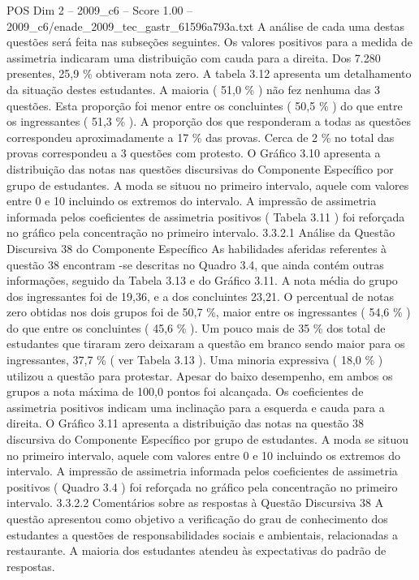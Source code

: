 \begin{textsample}{POS Dim 2 – 2009\_c6 – Score 1.00 – 2009\_c6/enade\_2009\_tec\_gastr\_61596a793a.txt}
A análise de cada uma destas questões será feita nas subseções seguintes.
Os valores positivos para a medida de assimetria indicaram uma distribuição com cauda para a direita.
Dos 7.280 presentes, 25,9 \% obtiveram nota zero.
A tabela 3.12 apresenta um detalhamento da situação destes estudantes.
A maioria ( 51,0 \% ) não fez nenhuma das 3 questões.
Esta proporção foi menor entre os concluintes ( 50,5 \% ) do que entre os ingressantes ( 51,3 \% ).
A proporção dos que responderam a todas as questões correspondeu aproximadamente a 17 \% das provas.
Cerca de 2 \% no total das provas correspondeu a 3 questões com protesto.
O Gráfico 3.10 apresenta a distribuição das notas nas questões discursivas do Componente Específico por grupo de estudantes.
A moda se situou no primeiro intervalo, aquele com valores entre 0 e 10 incluindo os extremos do intervalo.
A impressão de assimetria informada pelos coeficientes de assimetria positivos ( Tabela 3.11 ) foi reforçada no gráfico pela concentração no primeiro intervalo. 3.3.2.1 Análise da Questão Discursiva 38 do Componente Específico As habilidades aferidas referentes à questão 38 encontram -se descritas no Quadro 3.4, que ainda contém outras informações, seguido da Tabela 3.13 e do Gráfico 3.11.
A nota média do grupo dos ingressantes foi de 19,36, e a dos concluintes 23,21.
O percentual de notas zero obtidas nos dois grupos foi de 50,7 \%, maior entre os ingressantes ( 54,6 \% ) do que entre os concluintes ( 45,6 \% ).
Um pouco mais de 35 \% dos total de estudantes que tiraram zero deixaram a questão em branco sendo maior para os ingressantes, 37,7 \% ( ver Tabela 3.13 ).
Uma minoria expressiva ( 18,0 \% ) utilizou a questão para protestar.
Apesar do baixo desempenho, em ambos os grupos a nota máxima de 100,0 pontos foi alcançada.
Os coeficientes de assimetria positivos indicam uma inclinação para a esquerda e cauda para a direita.
O Gráfico 3.11 apresenta a distribuição das notas na questão 38 discursiva do Componente Específico por grupo de estudantes.
A moda se situou no primeiro intervalo, aquele com valores entre 0 e 10 incluindo os extremos do intervalo.
A impressão de assimetria informada pelos coeficientes de assimetria positivos ( Quadro 3.4 ) foi reforçada no gráfico pela concentração no primeiro intervalo. 3.3.2.2 Comentários sobre as respostas à Questão Discursiva 38 A questão apresentou como objetivo a verificação do grau de conhecimento dos estudantes a questões de responsabilidades sociais e ambientais, relacionadas a restaurante.
A maioria dos estudantes atendeu às expectativas do padrão de respostas.

\end{textsample}
